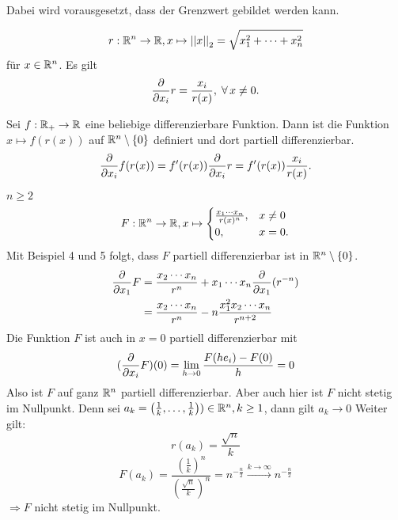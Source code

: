 \documentclass[../ana2u.tex]{subfiles}
\begin{document}
Dabei wird vorausgesetzt, dass der Grenzwert gebildet 
werden kann.

\begin{bsp}
    \[ r:\mathbb{R}^n\rightarrow \mathbb{R}, x \mapsto \left|\left|x\right|\right|_2 
    = \sqrt{x_1^2 + \dots + x_n^2} \] 
    für \(x \in \mathbb{R}^n\).
    Es gilt
    \[ \ddxpartial{x_i} r = \frac{x_i}{r(x)}, 
    \; \forall x \neq 0. \]
\end{bsp}
\begin{bsp}
    Sei \(f:\mathbb{R}_+\rightarrow \mathbb{R}\) eine beliebige differenzierbare
    Funktion. Dann ist die Funktion \( x \mapsto f(r(x)) \) auf 
    \( \mathbb{R}^n \setminus \{0\} \) definiert und 
    dort partiell differenzierbar.
    \[ \frac{\partial}{\partial x_i} f(r(x)) = f'(r(x)) 
    \frac{\partial}{\partial x_i} r = f'(r(x)) \frac{x_i}{r(x)}. \]
\end{bsp}
\begin{bsp}
    \( n \geq 2 \)
    \[ F:\mathbb{R}^n\rightarrow \mathbb{R}, x \mapsto \begin{cases}
        \frac{ x_1 \cdots x_n }{r(x)^n}, & x \neq 0\\
        0, & x = 0.
    \end{cases} \]
    Mit Beispiel 4 und 5 folgt, dass \( F \) partiell 
    differenzierbar ist in \( \mathbb{R}^n \setminus \{0\} \).
    \begin{align*}
        \frac{\partial}{\partial x_1} F 
        &= \frac{x_2 \cdots x_n}{r^n}
        + x_1 \cdots x_n \frac{\partial}{\partial x_1} (r^{-n}) \\
        &= \frac{x_2 \cdots x_n}{r^n} 
        - n \frac{x_1^2 x_2 \cdots x_n}{r^{n+2}}
    \end{align*}
    Die Funktion \(F\) ist auch in \(x = 0\) partiell 
    differenzierbar mit 
    \[ (\frac{\partial}{\partial x_i} F)(0) = \lim\limits_{h\rightarrow{}0} 
    \frac{F(h e_i) - F(0)}{h} = 0 \]
    Also ist \(F\) auf ganz \(\mathbb{R}^n\) partiell 
    differenzierbar. Aber auch hier ist \(F\) nicht 
    stetig im Nullpunkt. Denn sei 
    \( a_k = \left(\frac{1}{k}, \ldots, \frac{1}{k} \right)) 
    \in \mathbb{R}^n, k \geq 1 \), dann gilt \(a_k \rightarrow 0\)
    Weiter gilt:
    \[ r(a_k) = \frac{\sqrt{n}}{k} \]
    \[ F(a_k) = \frac{ (\frac{1}{k})^n }{ (\frac{\sqrt{n}}{k})^n }
    = n^{-\frac{n}{2}} \overset{k\rightarrow\infty}{\longrightarrow} 
    n^{-\frac{n}{2}} \]
    \( \Rightarrow  F \) nicht stetig im Nullpunkt.
\end{bsp}
\end{document}
